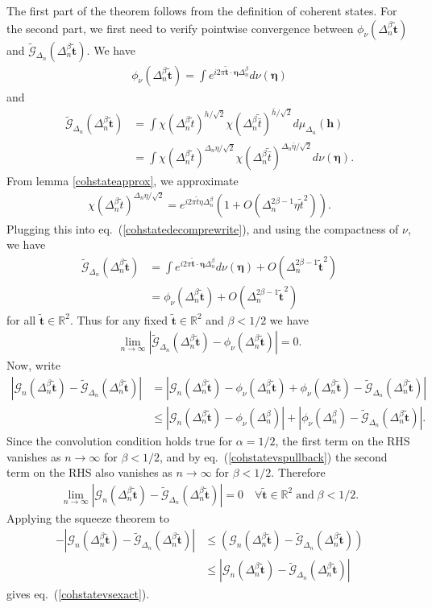 \documentclass[a4paper,11pt]{article}
\theoremstyle{plain}
\theoremstyle{definition}
\theoremstyle{remark}
\newcommand{\bs}[1]{\boldsymbol{#1}}
\newcommand{\ba}{\begin{equation} \begin{aligned}}
\newcommand{\ea}{\end{aligned} \end{equation}}
\newcommand{\De}{\Delta}
\begin{document}
\begin{appendix}
The first part of the theorem follows from the definition of coherent states. For the second part, we first need to verify pointwise convergence between $\phi_\nu(\De_n^\beta \tilde{\bs{t}})$ and $\tilde{\mathcal{G}}_{\De_n}(\De_n^{\beta}\tilde{\bs{t}})$. We have
\ba
\phi_\nu(\De_n^\beta\tilde{\bs{t}}) = \int e^{ i 2\pi \tilde{\bs{t}} \cdot \bs{\eta} \De_n^\beta} d\nu(\bs{\eta})
\ea
and
\ba
\tilde{\mathcal{G}}_{\De_n}(\De_n^{\beta}\tilde{\bs{t}}) &= \int \chi(\De_n^\beta \tilde{t})^{h/\sqrt{2}}  \chi(\De_n^\beta \tilde{\bar{t}})^{\bar{h}/\sqrt{2}} d\mu_{\De_n}(\bs{h})\\ &= \int \chi(\De_n^\beta \tilde{t})^{\De_n\eta/\sqrt{2}}  \chi(\De_n^\beta \tilde{\bar{t}})^{\De_n \bar{\eta}/\sqrt{2} } d\nu(\bs{\eta}).
\label{cohstatedecomprewrite}
\ea
From lemma \ref{cohstateapprox}, we approximate
\ba
\chi(\De_n^\beta \tilde{t})^{\De_n \eta/\sqrt{2}} = e^{i2\pi \tilde{t} \eta \De_n^{\beta}} \left(1 + O\left( \De_n^{2\beta - 1} \eta \tilde{t}^2\right) \right).
\ea
Plugging this into eq.~(\ref{cohstatedecomprewrite}), and using the compactness of $\nu$, we have
\ba
\tilde{\mathcal{G}}_{\De_n}(\De_n^{\beta}\tilde{\bs{t}}) &= \int e^{ i 2\pi \tilde{\bs{t}} \cdot \bs{\eta} \De_n^\beta} d\nu(\bs{\eta}) + O\left(\De_n^{2\beta -1} \tilde{\bs{t}}^2\right) \\
&= \phi_\nu(\De_n^\beta \tilde{\bs{t}}) + O\left(\De_n^{2\beta -1} \tilde{\bs{t}}^2\right) 
\ea
for all $\tilde{\bs{t}} \in \mathbb{R}^2$. Thus for any fixed $\tilde{\bs{t}} \in \mathbb{R}^2$ and $\beta < 1/2$ we have
\ba
\lim_{n\to \infty} | \tilde{\mathcal{G}}_{\De_n}(\De_n^{\beta}\tilde{\bs{t}}) - \phi_\nu(\De_n^\beta \tilde{\bs{t}})|  = 0.
\label{cohstatevspullback}
\ea
Now, write
\ba
|\mathcal{G}_n(\De_n^\beta \tilde{\bs{t}}) - \tilde{\mathcal{G}}_{\De_n}(\De_n^{\beta}\tilde{\bs{t}}) | &= |\mathcal{G}_n(\De_n^\beta \tilde{\bs{t}}) - \phi_\nu(\De_n^\beta \tilde{\bs{t}}) + \phi_\nu(\De_n^\beta \tilde{\bs{t}}) - \tilde{\mathcal{G}}_{\De_n}(\De_n^{\beta}\tilde{\bs{t}}) |\\
&\leq |\mathcal{G}_n(\De_n^\beta \tilde{\bs{t}}) - \phi_\nu(\De_n^\beta) | + |\phi_\nu(\De_n^\beta) - \tilde{\mathcal{G}}_{\De_n}(\De_n^{\beta}\tilde{\bs{t}}) |.
\ea
Since the convolution condition holds true for $\alpha = 1/2$, the first term on the RHS vanishes as $n \to \infty$ for $\beta < 1/2$, and by eq.~(\ref{cohstatevspullback}) the second term on the RHS also vanishes as $n \to \infty$ for $\beta < 1/2$. Therefore
\ba
\lim_{n \to \infty} |\mathcal{G}_n(\De_n^\beta \tilde{\bs{t}}) - \tilde{\mathcal{G}}_{\De_n}(\De_n^{\beta}\tilde{\bs{t}}) | = 0 \quad \forall \tilde{\bs{t}} \in \mathbb{R}^2 \;\text{and}\; \beta < 1/2.
\ea
Applying the squeeze theorem to 
\ba
-|\mathcal{G}_n(\De_n^\beta \tilde{\bs{t}}) - \tilde{\mathcal{G}}_{\De_n}(\De_n^{\beta}\tilde{\bs{t}})|&\leq\left( \mathcal{G}_n(\De_n^\beta \tilde{\bs{t}}) - \tilde{\mathcal{G}}_{\De_n}(\De_n^{\beta}\tilde{\bs{t}})\right) \\&\leq|\mathcal{G}_n(\De_n^\beta \tilde{\bs{t}}) - \tilde{\mathcal{G}}_{\De_n}(\De_n^{\beta}\tilde{\bs{t}})| 
\ea 
gives eq.~(\ref{cohstatevsexact}).



\end{appendix}
\end{document}
